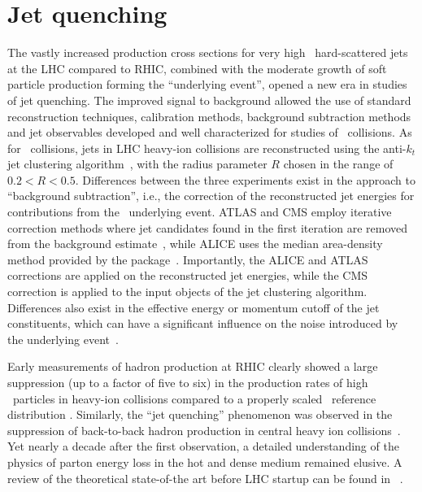 \section{Jet quenching}
\label{jets_intro}

The vastly increased production cross sections for very high \pT\ hard-scattered jets at the LHC
compared to RHIC, combined with the moderate growth of soft particle production forming the ``underlying
event'', opened a new era in studies of jet quenching. The improved signal to background allowed the
use of standard reconstruction techniques, calibration methods, background subtraction methods and
jet observables developed and well characterized for studies of \pp\ collisions.
As for \pp\ collisions, jets in LHC heavy-ion collisions are reconstructed using
the {} anti-$k_t$ jet clustering algorithm~\cite{Cacciari:2008gp}, with the
radius parameter $R$ chosen in the range of $0.2 < R  < 0.5$. Differences between the three
experiments exist in the approach to ``background subtraction'', i.e., the correction
of the reconstructed jet energies for contributions from the \PbPb\ underlying event. 
ATLAS and CMS employ iterative correction methods where jet candidates found in
the first iteration are removed from the background estimate~\cite{Kodolova:2007hd,Grau:2008ed},
while ALICE uses the median area-density method provided by the {} package~\cite{Cacciari:2011ma}.
Importantly, the ALICE and ATLAS corrections are applied on the reconstructed jet energies,
while the CMS correction is applied to the input objects of the jet clustering algorithm.
Differences also exist in the effective energy or momentum cutoff of the jet constituents,
which can have a significant influence on the noise introduced by the underlying event~\cite{Abelev:2012ej}.

Early measurements of hadron production at RHIC
clearly showed a large suppression (up to a factor of five to six) in the production rates of
high \pT\ particles in heavy-ion collisions compared to a properly scaled \pp\ reference distribution
\cite{Adcox:2001jp,Adler:2002xw}. Similarly, the ``jet quenching'' phenomenon was observed
in the suppression of back-to-back hadron production
in central heavy ion collisions~\cite{Adcox:2001jp,Adler:2002xw}. Yet nearly a decade after the first observation, a detailed
understanding of the physics of parton energy loss in the hot and dense medium remained
elusive. A review of the theoretical state-of-the art before LHC startup can be
found in ~\cite{Wiedemann:2009sh}.

